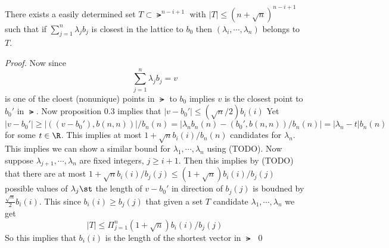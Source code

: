 \documentclass[12pt]{amsart}
\begin{document}
\begin{problem}
\begin{subproblem}
    \begin{proposition}
      There exists a easily determined set $T\subset \lat^{n-i+1}$ with $|T|\leq (n+\sqrt n)^{n-i+1}$ such that if $\sum_{j=1}^n \lambda_jb_j$ is closest in the lattice to $b_0$ then $(\lambda_i,\cdots,\lambda_n)$ belongs to $T$. 
    \end{proposition}
    \begin{proof}
      Now since 
      \[\sum_{j=1}^n\lambda_jb_j=v\]
      is one of the cloest (nonunique) points in $\lat$ to $b_0$ implies $v$ is the closest point to $b_0'$ in $\lat$. Now proposition 0.3 implies that $|v-b_0'| \leq (\sqrt{n}/2)b_i(i)$ Yet $|v-b_0'| \geq |((v-b_0'),b(n,n))|/b_n(n)=|\lambda_nb_n(n)-(b_0',b(n,n))/b_n(n)|=|\lambda_n-t|b_n(n)$ for some $t\in\R$. This implies at most $1+\sqrt{n}b_i(i)/b_n(n)$ candidates for $\lambda_n$. This implies we can show a similar bound for $\lambda_1,\cdots,\lambda_n$ using (TODO). Now suppose $\lambda_{j+1},\cdots,\lambda_n$ are fixed integers, $j\geq i+1$. Then this implies by (TODO) that there are at most $1+\sqrt n b_i(i)/b_j(j) \leq (1+\sqrt n)b_i(i)/b_j(j)$ possible values of $\lambda_j\st$ the length of $v-b_0'$ in direction of $b_j(j)$ is boudned by $\frac{\sqrt n}2 b_i(i)$. This since $b_i(i)\geq b_j(j)$ that given a set $T$ candidate $\lambda_1,\cdots,\lambda_n$ we get 
      \[|T|\leq \Pi_{j=1}^n (1+\sqrt n)b_i(i)/b_j(j)\]
    So this implies that $b_i(i)$ is the length of the shortest vector in $\lat$ \qed
    \end{proof}


\end{subproblem}
\end{problem}
\end{document}
